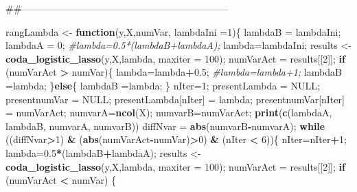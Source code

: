 \documentclass[]{book}
\newenvironment{Shaded}{\begin{snugshade}}{\end{snugshade}}
\newcommand{\KeywordTok}[1]{\textcolor[rgb]{0.13,0.29,0.53}{\textbf{#1}}}
\newcommand{\DataTypeTok}[1]{\textcolor[rgb]{0.13,0.29,0.53}{#1}}
\newcommand{\DecValTok}[1]{\textcolor[rgb]{0.00,0.00,0.81}{#1}}
\newcommand{\FloatTok}[1]{\textcolor[rgb]{0.00,0.00,0.81}{#1}}
\newcommand{\StringTok}[1]{\textcolor[rgb]{0.31,0.60,0.02}{#1}}
\newcommand{\CommentTok}[1]{\textcolor[rgb]{0.56,0.35,0.01}{\textit{#1}}}
\newcommand{\OtherTok}[1]{\textcolor[rgb]{0.56,0.35,0.01}{#1}}
\newcommand{\ControlFlowTok}[1]{\textcolor[rgb]{0.13,0.29,0.53}{\textbf{#1}}}
\newcommand{\OperatorTok}[1]{\textcolor[rgb]{0.81,0.36,0.00}{\textbf{#1}}}
\newcommand{\NormalTok}[1]{#1}
\begin{document}
\begin{Shaded}
\begin{Highlighting}[]
\NormalTok{##-----------------------------------------------------------------}

\NormalTok{rangLambda <-}\StringTok{ }\ControlFlowTok{function}\NormalTok{(y,X,numVar, }\DataTypeTok{lambdaIni =}\DecValTok{1}\NormalTok{)\{}
\NormalTok{  lambdaB =}\StringTok{ }\NormalTok{lambdaIni;}
\NormalTok{  lambdaA =}\StringTok{ }\DecValTok{0}\NormalTok{;}
  \CommentTok{#lambda=0.5*(lambdaB+lambdaA);}
\NormalTok{  lambda=lambdaIni;}
\NormalTok{  results <-}\StringTok{ }\KeywordTok{coda_logistic_lasso}\NormalTok{(y,X,lambda, }\DataTypeTok{maxiter =} \DecValTok{100}\NormalTok{);}
\NormalTok{  numVarAct =}\StringTok{ }\NormalTok{results[[}\DecValTok{2}\NormalTok{]];}
  \ControlFlowTok{if}\NormalTok{ (numVarAct }\OperatorTok{>}\StringTok{ }\NormalTok{numVar)\{}
\NormalTok{    lambda=lambda}\OperatorTok{+}\FloatTok{0.5}\NormalTok{;}
    \CommentTok{#lambda=lambda+1;}
\NormalTok{    lambdaB =lambda;}
\NormalTok{  \}}\ControlFlowTok{else}\NormalTok{\{}
\NormalTok{    lambdaB =lambda; }
\NormalTok{  \}}
\NormalTok{  nIter=}\DecValTok{1}\NormalTok{;}
\NormalTok{  presentLambda =}\StringTok{ }\OtherTok{NULL}\NormalTok{;}
\NormalTok{  presentnumVar =}\StringTok{ }\OtherTok{NULL}\NormalTok{;}
\NormalTok{  presentLambda[nIter] =}\StringTok{ }\NormalTok{lambda;}
\NormalTok{  presentnumVar[nIter] =}\StringTok{ }\NormalTok{numVarAct;}
\NormalTok{  numvarA=}\KeywordTok{ncol}\NormalTok{(X);}
\NormalTok{  numvarB=numVarAct;}
  \KeywordTok{print}\NormalTok{(}\KeywordTok{c}\NormalTok{(lambdaA, lambdaB, numvarA, numvarB))}
\NormalTok{  diffNvar =}\StringTok{ }\KeywordTok{abs}\NormalTok{(numvarB}\OperatorTok{-}\NormalTok{numvarA);}
  \ControlFlowTok{while}\NormalTok{ ((diffNvar}\OperatorTok{>}\DecValTok{1}\NormalTok{) }\OperatorTok{&}\StringTok{ }\NormalTok{(}\KeywordTok{abs}\NormalTok{(numVarAct}\OperatorTok{-}\NormalTok{numVar)}\OperatorTok{>}\DecValTok{0}\NormalTok{) }\OperatorTok{&}\StringTok{ }\NormalTok{(nIter }\OperatorTok{<}\StringTok{ }\DecValTok{6}\NormalTok{))\{}
\NormalTok{    nIter=nIter}\OperatorTok{+}\DecValTok{1}\NormalTok{;}
\NormalTok{    lambda=}\FloatTok{0.5}\OperatorTok{*}\NormalTok{(lambdaB}\OperatorTok{+}\NormalTok{lambdaA);}
\NormalTok{    results <-}\StringTok{ }\KeywordTok{coda_logistic_lasso}\NormalTok{(y,X,lambda, }\DataTypeTok{maxiter =} \DecValTok{100}\NormalTok{);}
\NormalTok{    numVarAct =}\StringTok{ }\NormalTok{results[[}\DecValTok{2}\NormalTok{]];}
    \ControlFlowTok{if}\NormalTok{ (numVarAct }\OperatorTok{<}\StringTok{ }\NormalTok{numVar) \{}

\end{Highlighting}
\end{Shaded}
\end{document}
